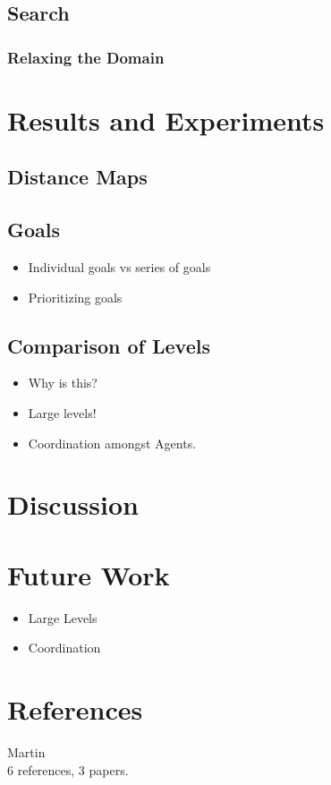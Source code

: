 \documentclass[letterpaper]{article}
\begin{document}
	\subsection{Search}
		\subsubsection{Relaxing the Domain}

\section{Results and Experiments}
	\subsection{Distance Maps}
	\subsection{Goals}
		\begin{itemize}
			\item{Individual goals vs series of goals}
			\item{Prioritizing goals}
		\end{itemize}

	\subsection{Comparison of Levels}
		\begin{itemize}
			\item{Why is this?}
			\item{Large levels!}
			\item{Coordination amongst Agents.}
		\end{itemize}

\section{Discussion}

\section{Future Work}
	\begin{itemize}
		\item{Large Levels}
		\item{Coordination}
	\end{itemize}

\section{References}
	Martin\\
	6 references, 3 papers.
		
		


\end{document}

